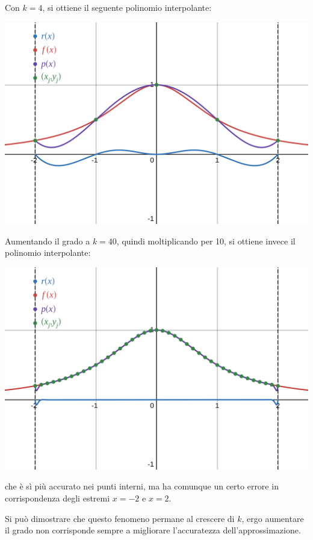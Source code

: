 \documentclass[a4paper,11pt]{article}
\begin{document}
Con $k = 4$, si ottiene il seguente polinomio interpolante:
\begin{center}
	\includegraphics[scale=0.28]{../figures/runge_k4.png}
\end{center}

\newpage

Aumentando il grado a $k = 40$, quindi moltiplicando per 10, si ottiene invece il polinomio interpolante:
\begin{center}
	\includegraphics[scale=0.28]{../figures/runge_k40.png}
\end{center}
che è sì più accurato nei punti interni, ma ha comunque un certo errore in corrispondenza degli estremi $x = -2$ e $x = 2$.

Si può dimostrare che questo fenomeno permane al crescere di $k$, ergo aumentare il grado non corrisponde sempre a migliorare l'accuratezza dell'approssimazione.
\end{document}
